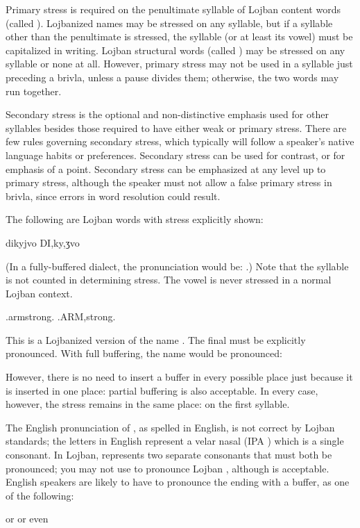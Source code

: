 Primary stress is required on the penultimate syllable of Lojban content words (called ). Lojbanized names may be stressed on any syllable, but if a syllable other than the penultimate is stressed, the syllable (or at least its vowel) must be capitalized in writing. Lojban structural words (called ) may be stressed on any syllable or none at all. However, primary stress may not be used in a syllable just preceding a brivla, unless a pause divides them; otherwise, the two words may run together.

Secondary stress is the optional and non-distinctive emphasis used for other syllables besides those required to have either weak or primary stress. There are few rules governing secondary stress, which typically will follow a speaker's native language habits or preferences. Secondary stress can be used for contrast, or for emphasis of a point. Secondary stress can be emphasized at any level up to primary stress, although the speaker must not allow a false primary stress in brivla, since errors in word resolution could result.

The following are Lojban words with stress explicitly shown:
\begin{example}
dikyjvo\n
DI,ky,ʒvo
\end{example}

(In a fully-buffered dialect, the pronunciation would be: .) Note that the syllable  is not counted in determining stress. The vowel  is never stressed in a normal Lojban context.
\begin{example}
.armstrong.\n
.ARM,strong.
\end{example}

This is a Lojbanized version of the name . The final  must be explicitly pronounced. With full buffering, the name would be pronounced:
\begin{example}
\end{example}

However, there is no need to insert a buffer in every possible place just because it is inserted in one place: partial buffering is also acceptable. In every case, however, the stress remains in the same place: on the first syllable.

The English pronunciation of , as spelled in English, is not correct by Lojban standards; the letters  in English represent a velar nasal (IPA ) which is a single consonant. In Lojban,  represents two separate consonants that must both be pronounced; you may not use  to pronounce Lojban , although  is acceptable. English speakers are likely to have to pronounce the ending with a buffer, as one of the following:
\begin{example}
\n
or \n
or even 
\end{example}

